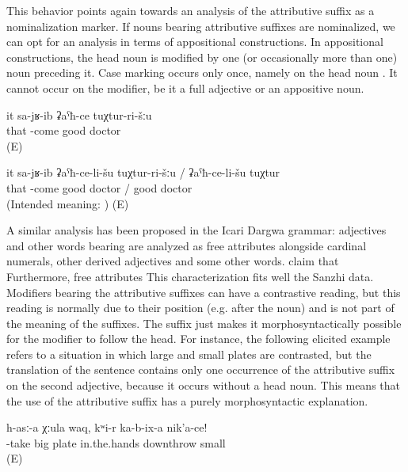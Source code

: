 This behavior points again towards an analysis of the attributive suffix as a nominalization marker. If nouns bearing attributive suffixes are nominalized, we can opt for an analysis in terms of appositional constructions. In appositional constructions, the head noun is modified by one (or occasionally more than one) noun preceding it. Case marking occurs only once, namely on the head noun . It cannot occur on the modifier, be it a full adjective or an appositive noun.
%
\begin{exe}
	\ex	\label{ex:He went to a good doctor minor}
	\gll	it	sa-jʁ-ib	ʡaˁħ-ce	tuχtur-ri-šːu\\
		that	-come	good	doctor\\
	\glt	{} (E)

	\ex	\label{ex:He went to a good doctor ungrammatical minor}
	\gll	{*}	it	sa-jʁ-ib	ʡaˁħ-ce-li-šu	tuχtur-ri-šːu	/	ʡaˁħ-ce-li-šu	tuχtur\\
		{}	that	-come	good	doctor	/	good	doctor\\
	\glt	‎(Intended meaning: ) (E)
\end{exe}

A similar analysis has been proposed in the Icari Dargwa grammar: adjectives and other words bearing  are analyzed as free attributes alongside cardinal numerals, other derived adjectives and some other words. \citet[48, 129]{Sumbatova.Mutalov2003} claim that  Furthermore, free attributes  This characterization fits well the Sanzhi data. Modifiers bearing the attributive suffixes can have a contrastive reading, but this reading is normally due to their position (e.g. after the noun) and is not part of the meaning of the suffixes. The suffix just makes it morphosyntactically possible for the modifier to follow the head. For instance, the following elicited example refers to a situation in which large and small plates are contrasted, but the translation of the sentence contains only one occurrence of the attributive suffix on the second adjective, because it occurs without a head noun. This means that the use of the attributive suffix has a purely morphosyntactic explanation.
%
\begin{exe}
	\ex	\label{ex:Take the large plate, put away the small one minor}
	\gll	h-asː-a	χːula	waq,	kʷi-r	ka-b-ix-a	nik'a-ce!\\
		-take	big	plate	in.the.hands	downthrow	small\\
	\glt	{} (E)
\end{exe}

